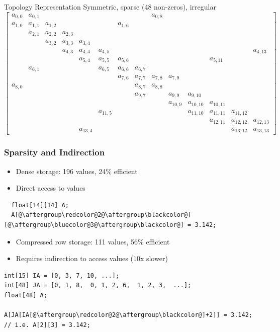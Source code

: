 \documentclass[xcolor=dvipsnames]{beamer}
\begin{document}
\begin{frame}{Topology Representation}
Symmetric, sparse (48 non-zeros), irregular
  \begingroup
  \tiny
  \centering
\begin{equation*}
\begin{bmatrix}
a_{0,0} & a_{0,1} &  &  &  &  &  &  & a_{0,8} &  &  &  &  & \\
a_{1,0} & a_{1,1} & a_{1,2} &  &  &  & a_{1,6} &  &  &  &  &  &  & \\
& a_{2,1} & a_{2,2} & a_{2,3} &  &  &  &  &  &  &  &  &  & \\
&  & a_{3,2} & a_{3,3} & a_{3,4} &  &  &  &  &  &  &  &  & \\
&  &  & a_{4,3} & a_{4,4} & a_{4,5} &  &  &  &  &  &  &  & a_{4,13} \\
&  &  &  & a_{5,4} & a_{5,5} & a_{5,6} &  &  &  &  & a_{5,11} &  & \\
& a_{6,1} &  &  &  & a_{6,5} & a_{6,6} & a_{6,7} &  &  &  &  &  & \\
&  &  &  &  &  & a_{7,6} & a_{7,7} & a_{7,8} & a_{7,9} &  &  &  & \\
a_{8,0} &  &  &  &  &  &  & a_{8,7} & a_{8,8} &  &  &  &  & \\
&  &  &  &  &  &  & a_{9,7} &  & a_{9,9} & a_{9,10} &  &  & \\
&  &  &  &  &  &  &  &  & a_{10,9} & a_{10,10} & a_{10,11} &  & \\
&  &  &  &  & a_{11,5} &  &  &  &  & a_{11,10} & a_{11,11} & a_{11,12} & \\
&  &  &  &  &  &  &  &  &  &  & a_{12,11} & a_{12,12}  & a_{12,13}\\
&  &  &  & a_{13,4} &  &  &  &  &  &  &  & a_{13,12} &  a_{13,13}
\end{bmatrix}
\end{equation*}
\endgroup
\end{frame}


\begin{frame}[fragile]
  \frametitle{Sparsity and Indirection}
  \begin{itemize}
  \item Dense storage: 196 values, 24\% efficient
  \item Direct access to values
  \end{itemize}
\begin{lstlisting}
  float[14][14] A;
  A[@\aftergroup\redcolor@2@\aftergroup\blackcolor@][@\aftergroup\bluecolor@3@\aftergroup\blackcolor@] = 3.142;
\end{lstlisting}
\vspace{5mm}
  \begin{itemize}
  \item Compressed row storage: 111 values, 56\% efficient
  \item Requires indirection to access values (10x slower)
  \end{itemize}
\begin{lstlisting}
int[15] IA = [0, 3, 7, 10, ...];
int[48] JA = [0, 1, 8,  0, 1, 2, 6,  1, 2, 3,  ...];
float[48] A;

A[JA[IA[@\aftergroup\redcolor@2@\aftergroup\blackcolor@]+2]] = 3.142; // i.e. A[2][3] = 3.142;
\end{lstlisting}
\end{frame}
\end{document}
